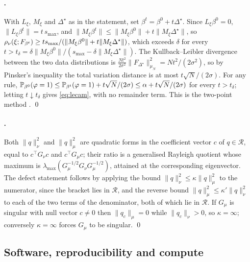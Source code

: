 \paragraph{.} With $L_\xi$, $M_\xi$ and $\Delta^\star$ as in the
statement, set $\beta^t =
\beta^0 + t\Delta^\star$. Since $L_\xi \beta^0 = 0$, $\|L_\xi\beta^t\| =
t\,s_{\max}$, and $\|M_\xi \beta^t\| \le \|M_\xi\beta^0\| +
t\|M_\xi\Delta^\star\|$, so $\rho_\nu(\xi;F_{\beta^t}) \ge t s_{\max}/
(\|M_\xi\beta^0\| + t\|M_\xi\Delta^\star\|)$, which exceeds $\delta$ for every
$t > t_\delta = \delta\|M_\xi\beta^0\|/(s_{\max}-\delta\|M_\xi\Delta^\star\|)$.
The Kullback--Leibler divergence between the two data distributions is
$\tfrac{N t^2}{2\sigma^2}\|F_{\Delta^\star}\|^2_{\mu_N} = Nt^2/(2\sigma^2)$, so
by Pinsker's inequality the total variation distance is at most
$t\sqrt N/(2\sigma)$. For any rule, $\mathbb{P}_{\beta^0}(\varphi=1) \le
\mathbb{P}_{\beta^{t}}(\varphi=1) + t\sqrt N/(2\sigma) \le \alpha + t\sqrt
N/(2\sigma)$ for every $t > t_\delta$; letting $t \downarrow t_\delta$ gives
\eqref{eq:lecam}, with no remainder term. This is the two-point method
\citep[Ch.~2]{tsybakov2009introduction}. \qed

\paragraph{.} Both $\|q\|^2_{\nu}$ and $\|q\|^2_{\mu}$ are
quadratic forms in the coefficient vector $c$ of $q \in \mathcal R$, equal to
$c^{\!\top}G_\nu c$ and $c^{\!\top}G_\mu c$; their ratio is a generalised
Rayleigh quotient whose maximum is
$\lambda_{\max}(G_\mu^{-1/2}G_\nu G_\mu^{-1/2})$, attained at the corresponding
eigenvector. The defect statement follows by applying the bound
$\|q\|^2_\nu \le \kappa\|q\|^2_\mu$ to the numerator, since the bracket lies in
$\mathcal R$, and the reverse bound $\|q\|^2_\mu \le \kappa'\|q\|^2_\nu$ to
each of the two terms of the denominator, both of which lie in $\mathcal R$.
If $G_\mu$ is singular with null
vector $c \ne 0$ then $\|q_c\|_{\mu} = 0$ while $\|q_c\|_{\nu}>0$, so $\kappa =
\infty$; conversely $\kappa = \infty$ forces $G_\mu$ to be singular. \qed

\subsection{Software, reproducibility and compute}
\label{app:repro}

